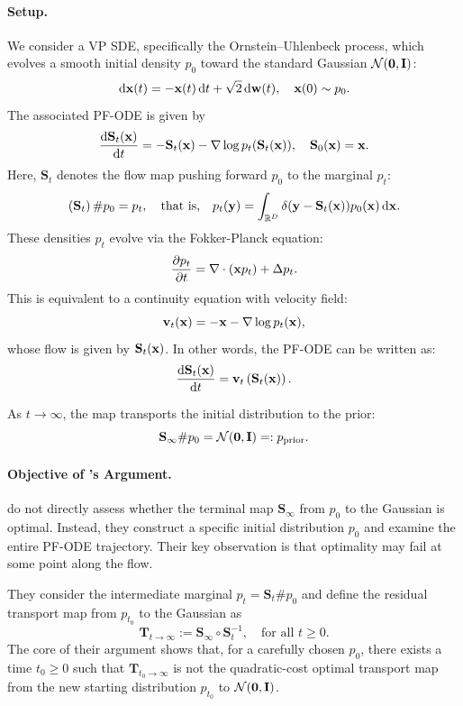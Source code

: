 \paragraph{Setup.} We consider a VP SDE, specifically the Ornstein–Uhlenbeck process, which evolves a smooth initial density $p_0$ toward the standard Gaussian $\mathcal{N}(\bm{0}, {\mathbf{I}})$:
\[
\mathop{}\!\mathrm{d} {\mathbf{x}}(t) = -{\mathbf{x}}(t) \mathop{}\!\mathrm{d} t + \sqrt{2} \mathop{}\!\mathrm{d} {\mathbf{w}}(t), \quad {\mathbf{x}}(0) \sim p_0.
\]
The associated PF-ODE is given by
\[
\frac{\mathop{}\!\mathrm{d} \mathbf{S}_t({\mathbf{x}})}{\mathop{}\!\mathrm{d} t} = -\mathbf{S}_t({\mathbf{x}}) - \nabla \log p_t(\mathbf{S}_t({\mathbf{x}})), \quad \mathbf{S}_0({\mathbf{x}}) = {\mathbf{x}}.
\]
Here, $\mathbf{S}_t$ denotes the flow map pushing forward $p_0$ to the marginal $p_t$:
\[
\left(\mathbf{S}_t\right) \# p_0 = p_t,
\quad\text{that is,}\quad
p_t({\mathbf{y}}) = \int_{\mathbb{R}^D} \delta({\mathbf{y}} - \mathbf{S}_t({\mathbf{x}}))   p_0({\mathbf{x}}) \mathop{}\!\mathrm{d} {\mathbf{x}}.
\]
These densities $p_t$ evolve via the Fokker-Planck equation:
\[
\frac{\partial p_t}{\partial t} = \nabla \cdot ({\mathbf{x}} p_t) + \Delta p_t.
\]
This is equivalent to a continuity equation with velocity field:
\[
{\mathbf{v}}_t({\mathbf{x}}) = -{\mathbf{x}} - \nabla \log p_t({\mathbf{x}}),
\]
whose flow is given by $\mathbf{S}_t({\mathbf{x}})$. In other words, the PF-ODE can be written as: 
\[
\frac{\mathop{}\!\mathrm{d} \mathbf{S}_t({\mathbf{x}})}{\mathop{}\!\mathrm{d} t} = {\mathbf{v}}_t\left(\mathbf{S}_t({\mathbf{x}})\right).
\]

As $t \to \infty$, the map transports the initial distribution to the prior:
\[
\mathbf{S}_\infty \# p_0 = \mathcal{N}(\bm{0}, {\mathbf{I}}) =: p_{\text{prior}}.
\]
\paragraph{Objective of \citet{lavenant2022flow}'s Argument.}

\citet{lavenant2022flow} do not directly assess whether the terminal map $\mathbf{S}_\infty$ from $p_0$ to the Gaussian is optimal. Instead, they construct a specific initial distribution $p_0$ and examine the entire PF-ODE trajectory. Their key observation is that optimality may fail at some point along the flow.

They consider the intermediate marginal $p_t = \mathbf{S}_t \# p_0$ and define the residual transport map from $p_{t_0}$ to the Gaussian as
\[
\mathbf{T}_{t \to \infty} := \mathbf{S}_\infty \circ \mathbf{S}_{t}^{-1}, \quad \text{for all } t\geq 0.
\]
The core of their argument shows that, for a carefully chosen $p_0$, there exists a time $t_0 \geq 0$ such that $\mathbf{T}_{t_0 \to \infty}$ is not the quadratic-cost optimal transport map  from the new starting distribution $p_{t_0}$ to $\mathcal{N}(\bm{0}, {\mathbf{I}})$.

